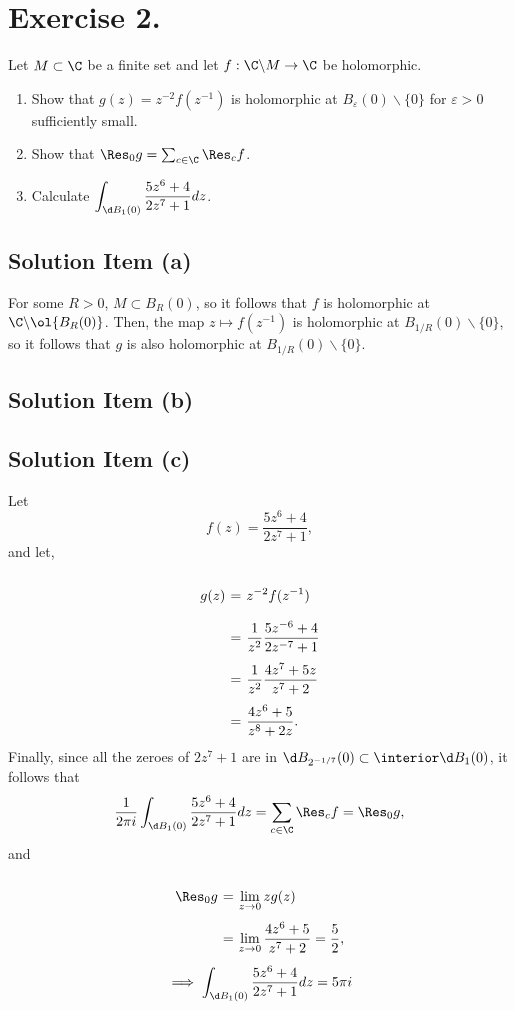 \section*{Exercise 2.}

Let $M \subset \C$ be a finite set and let $f:\C\backslash M \to \C$ be holomorphic.
\begin{enumerate}[label=(\alph*)]
    \item Show that $g(z) = z^{-2} f(z^{-1})$ is holomorphic at $B_\varepsilon(0)\backslash\{0\}$ for $\varepsilon > 0$ sufficiently small.
    \item Show that $\Res_0 g = \sum_{c\in \C} \Res_c f$.
    \item Calculate $\displaystyle \int_{\d B_1(0)} \frac{5z^6 + 4}{2z^7 + 1} dz$.
\end{enumerate}

\subsection*{Solution Item (a)}

For some $R > 0$, $M \subset B_R(0)$, so it follows that $f$ is holomorphic at $\C \backslash \ol{B_R(0)}$. Then, the map $z \mapsto f(z^{-1})$ is holomorphic at $B_{1/R}(0)\backslash \{0\}$, so it follows that $g$ is also holomorphic at $B_{1/R}(0)\backslash \{0\}$.

\subsection*{Solution Item (b)}

\subsection*{Solution Item (c)}

Let
\[ f(z) = \frac{5z^6 + 4}{2z^7 + 1}, \]
and let,
\[ \everymath{\displaystyle}
\arraycolsep=1.8pt\def\arraystretch{2.5}
\begin{array}{rcl}
    g(z) & = & z^{-2} f(z^{-1})\\
    & = & \frac{1}{z^2} \frac{5z^{-6} + 4}{2z^{-7} + 1}\\
    & = & \frac{1}{z^2} \frac{4 z^{7} + 5z}{z^7 + 2}\\
    & = & \frac{4 z^{6} + 5}{z^8 + 2z}.
\end{array} \]
Finally, since all the zeroes of $2z^7 + 1$ are in $\d B_{2^{-1/7}}(0) \subset \interior \d B_{1}(0)$, it follows that
\[ \frac{1}{2\pi i} \int_{\d B_1(0)} \frac{5z^6 + 4}{2z^7 + 1} dz = \sum_{c\in \C} \Res_c f = \Res_0 g ,\]
and
\[ \everymath{\displaystyle}
\arraycolsep=1.8pt\def\arraystretch{2.5}
\begin{array}{rcl}
    \Res_0 g & = & \lim_{z\to 0} z g(z)\\
    & = & \lim_{z\to 0} \frac{4 z^{6} + 5}{z^7 + 2} = \frac{5}{2},
\end{array} \]
\[ \implies  \int_{\d B_1(0)} \frac{5z^6 + 4}{2z^7 + 1} dz = 5\pi i\]